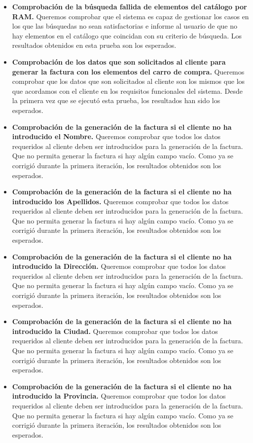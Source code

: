 \begin{itemize}
\begin{itemize}
	\item \textbf{Comprobación de la búsqueda fallida de elementos del catálogo por RAM.} Queremos comprobar que el sistema es capaz de gestionar los casos en los que las búsquedas no sean satisfactorias e informe al usuario de que no hay elementos en el catálogo que coincidan con su criterio de búsqueda. Los resultados obtenidos en esta prueba son los esperados.
	\item \textbf{Comprobación de los datos que son solicitados al cliente para generar la factura con los elementos del carro de compra.} Queremos comprobar que los datos que son solicitados al cliente son los mismos que los que acordamos con el cliente en los requisitos funcionales del sistema. Desde la primera vez que se ejecutó esta prueba, los resultados han sido los esperados.
	\item \textbf{Comprobación de la generación de la factura si el cliente no ha introducido el Nombre.} Queremos comprobar que todos los datos requeridos al cliente deben ser introducidos para la generación de la factura. Que no permita generar la factura si hay algún campo vacío. Como ya se corrigió durante la primera iteración, los resultados obtenidos son los esperados.
	\item \textbf{Comprobación de la generación de la factura si el cliente no ha introducido los Apellidos.} Queremos comprobar que todos los datos requeridos al cliente deben ser introducidos para la generación de la factura. Que no permita generar la factura si hay algún campo vacío. Como ya se corrigió durante la primera iteración, los resultados obtenidos son los esperados.
	\item \textbf{Comprobación de la generación de la factura si el cliente no ha introducido la Dirección.} Queremos comprobar que todos los datos requeridos al cliente deben ser introducidos para la generación de la factura. Que no permita generar la factura si hay algún campo vacío. Como ya se corrigió durante la primera iteración, los resultados obtenidos son los esperados.
	\item \textbf{Comprobación de la generación de la factura si el cliente no ha introducido la Ciudad.} Queremos comprobar que todos los datos requeridos al cliente deben ser introducidos para la generación de la factura. Que no permita generar la factura si hay algún campo vacío. Como ya se corrigió durante la primera iteración, los resultados obtenidos son los esperados.
	\item \textbf{Comprobación de la generación de la factura si el cliente no ha introducido la Provincia.} Queremos comprobar que todos los datos requeridos al cliente deben ser introducidos para la generación de la factura. Que no permita generar la factura si hay algún campo vacío. Como ya se corrigió durante la primera iteración, los resultados obtenidos son los esperados.

\end{itemize}
\end{itemize}
